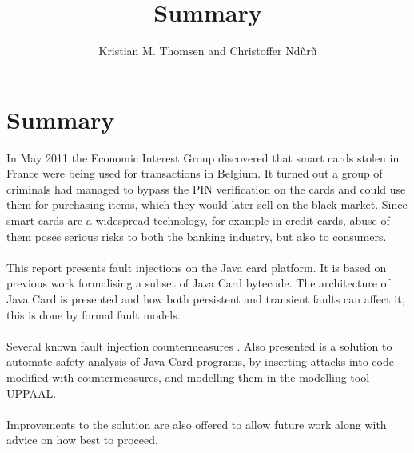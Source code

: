 \documentclass{article}
\begin{document}
\title{Summary}
\author{Kristian M. Thomsen and Christoffer Nd\~ur\~u}
\maketitle

\section{Summary}
In May 2011 the Economic Interest Group discovered that smart cards stolen in France were being used for transactions in Belgium. It turned out a group of criminals had managed to bypass the PIN verification on the cards and could use them for purchasing items, which they would later sell on the black market. Since smart cards are a widespread technology, for example in credit cards, abuse of them poses serious risks to both the banking industry, but also to consumers.\\\\
This report presents fault injections on the Java card platform. It is based on previous work formalising a subset of Java Card bytecode. The architecture of Java Card is presented and how both persistent and transient faults can affect it, this is done by formal fault models.\\\\

Several known fault injection countermeasures . Also presented is a solution to automate safety analysis of Java Card programs, by inserting attacks into code modified with countermeasures, and modelling them in the modelling tool UPPAAL.\\\\
Improvements to the solution are also offered to allow future work along with advice on how best to proceed.
\end{document}
